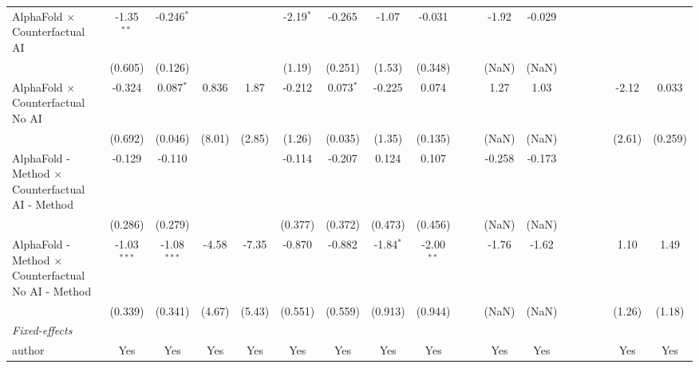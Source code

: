 \begin{tabular}{lcccccccccccccccccc}
   AlphaFold $\times$ Counterfactual AI                       & -1.35$^{**}$  & -0.246$^{*}$  &        &         & -2.19$^{*}$ & -0.265      & -1.07       & -0.031       &     &      & -1.92  & -0.029 &      &      &      &      &         &   \\   
                                                              & (0.605)       & (0.126)       &        &         & (1.19)      & (0.251)     & (1.53)      & (0.348)      &     &      & (NaN)  & (NaN)  &      &      &      &      &         &   \\   
   AlphaFold $\times$ Counterfactual No AI                    & -0.324        & 0.087$^{*}$   & 0.836  & 1.87    & -0.212      & 0.073$^{*}$ & -0.225      & 0.074        &     &      & 1.27   & 1.03   &      &      &      &      & -2.12   & 0.033\\   
                                                              & (0.692)       & (0.046)       & (8.01) & (2.85)  & (1.26)      & (0.035)     & (1.35)      & (0.135)      &     &      & (NaN)  & (NaN)  &      &      &      &      & (2.61)  & (0.259)\\   
   AlphaFold - Method $\times$ Counterfactual AI - Method     & -0.129        & -0.110        &        &         & -0.114      & -0.207      & 0.124       & 0.107        &     &      & -0.258 & -0.173 &      &      &      &      &         &   \\   
                                                              & (0.286)       & (0.279)       &        &         & (0.377)     & (0.372)     & (0.473)     & (0.456)      &     &      & (NaN)  & (NaN)  &      &      &      &      &         &   \\   
   AlphaFold - Method $\times$ Counterfactual No AI - Method  & -1.03$^{***}$ & -1.08$^{***}$ & -4.58  & -7.35   & -0.870      & -0.882      & -1.84$^{*}$ & -2.00$^{**}$ &     &      & -1.76  & -1.62  &      &      &      &      & 1.10    & 1.49\\   
                                                              & (0.339)       & (0.341)       & (4.67) & (5.43)  & (0.551)     & (0.559)     & (0.913)     & (0.944)      &     &      & (NaN)  & (NaN)  &      &      &      &      & (1.26)  & (1.18)\\   
   \midrule
   \emph{Fixed-effects}\\
   author                                                     & Yes           & Yes           & Yes    & Yes     & Yes         & Yes         & Yes         & Yes          &     &      & Yes    & Yes    &      &      &      &      & Yes     & Yes\\  

\end{tabular}
